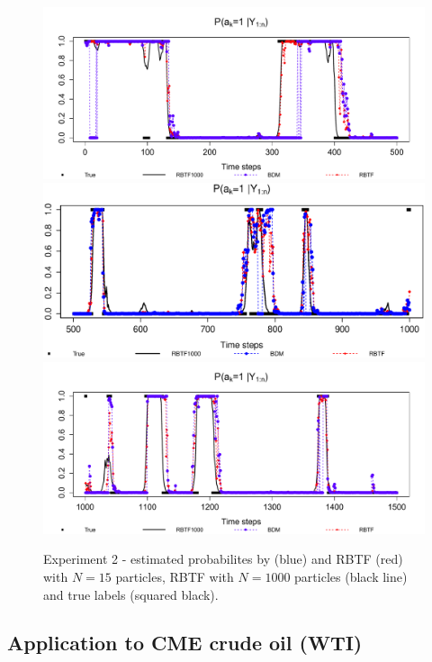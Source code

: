 \begin{figure}
\centering
\includegraphics[scale=.5]{N15_1_500}
\includegraphics[scale=.5]{N15_501_1000}
\includegraphics[scale=.5]{N15_1001_1500}
\caption{Experiment 2 - estimated probabilites by \cite{briers:doucet:maskell:2010} (blue) and RBTF (red) with $N=15$ particles, RBTF with $N=1000$ particles (black line) and true labels (squared black).}
\label{fig:exp2:label}
\end{figure}

\subsection{Application to CME crude oil (WTI)}
\label{sec:exp}

